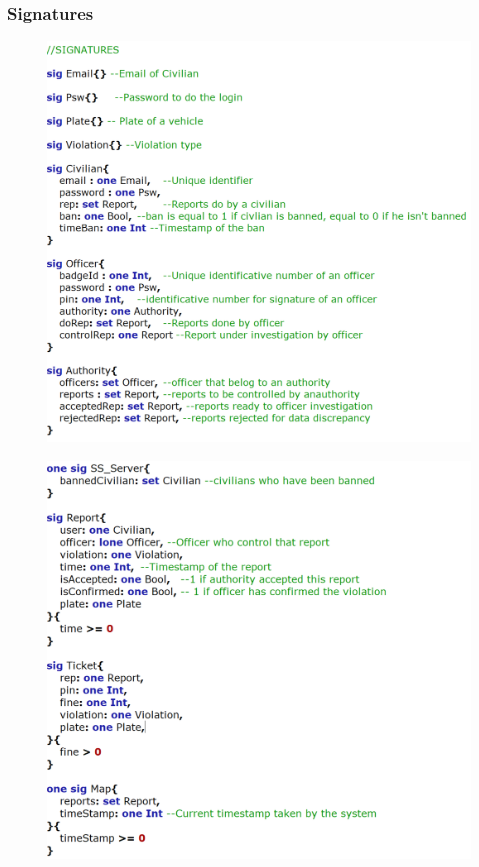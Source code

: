 \documentclass[12pt,a4paper]{article}
\begin{document}
\subsubsection{Signatures}
\begin{figure}[H]
\begin{adjustwidth}{-25mm}{-25mm}
				\centering
				\includegraphics[width=.75\paperwidth,height=.75\paperheight, keepaspectratio]{Images/Alloy/sig1}
\end{adjustwidth}
\end{figure}
\begin{figure}[H]
\begin{adjustwidth}{-25mm}{-25mm}
				\centering
				\includegraphics[width=.7\paperwidth,height=.7\paperheight, keepaspectratio]{Images/Alloy/sig2}
\end{adjustwidth}
\end{figure}
\end{document}
